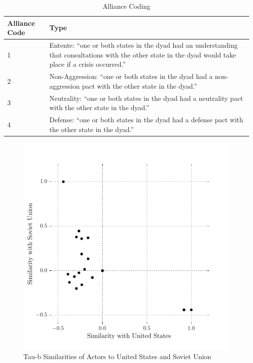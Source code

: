 \begin{table}[!h]
\centering
  \caption[Alliance Coding]{Alliance Coding \citep[descriptions quoted from][]{gibler_2013}}
  \label{table:alliance_types}
\begin{tabular}{p{2cm}p{6cm}}
\hline
Alliance Code & Type  \\
\hline
1             & Entente: ``one or both states in the dyad had an understanding that consultations with the other state in the dyad would take place if a crisis occurred.'' \\
2             & Non-Aggression: ``one or both states in the dyad had a non-aggression pact with the other state in the dyad.'' \\
3             & Neutrality: ``one or both states in the dyad had a neutrality pact with the other state in the dyad.'' \\
4             & Defense: ``one or both states in the dyad had a defense pact with the other state in the dyad.'' \\
\hline                                               
\end{tabular}
  \tableSpace
\end{table}

\begin{figure}[!h]
  \centering
  \includegraphics[scale=0.5]{ColdWar/Figures/us_sov_similarities}
  \caption{Tau-b Similarities of Actors to United States and Soviet Union}
  \label{fig:us_sov_corr}
  \figSpace
 \end{figure}

